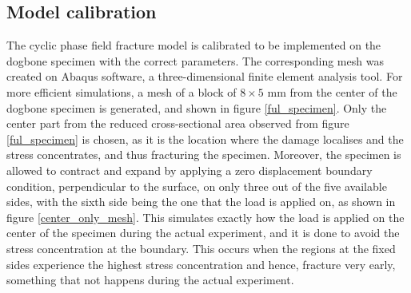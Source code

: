 \documentclass[11pt,a4paper]{article}
\begin{document}
\subsection{Model calibration}
The cyclic phase field fracture model is calibrated to be implemented on the dogbone specimen with the correct parameters. The corresponding mesh was created on Abaqus software, a three-dimensional finite element analysis tool. For more efficient simulations, a mesh of a block of $8\times 5$ mm from the center of the dogbone specimen is generated, and shown in figure \ref{ful_specimen}. Only the center part from the reduced cross-sectional area observed from figure \ref{ful_specimen} is chosen, as it is the location where the damage localises and the stress concentrates, and thus fracturing the specimen. Moreover, the specimen is allowed to contract and expand by applying a zero displacement boundary condition, perpendicular to the surface, on only three out of the five available sides, with the sixth side being the one that the load is applied on, as shown in figure \ref{center_only_mesh}. This simulates exactly how the load is applied on the center of the specimen during the actual experiment, and it is done to avoid the stress concentration at the boundary. This occurs when the regions at the fixed sides experience the highest stress concentration and hence, fracture very early, something that not happens during the actual experiment. 
\end{document}
